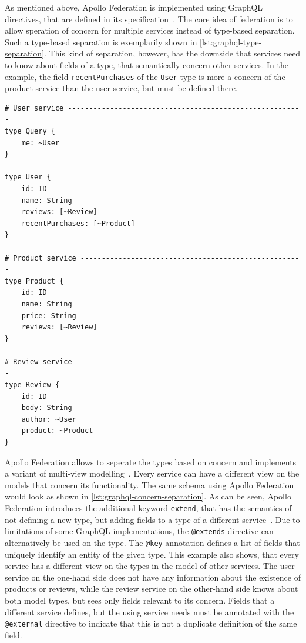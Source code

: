 As mentioned above, Apollo Federation is implemented using GraphQL directives, that are defined in its specification~\cite{MDGa}.
The core idea of federation is to allow speration of concern for multiple services instead of type-based separation.
Such a type-based separation is exemplarily shown in \autoref{lst:graphql-type-separation}.
This kind of separation, however, has the downside that services need to know about fields of a type, that semantically concern other services.
In the example, the field \texttt{recentPurchases} of the \texttt{User} type is more a concern of the product service than the user service, but must be defined there.

\begin{lstlisting}[language=graphqls, caption={Type-based separation in GraphQL Schemas~\cite{MDG}}, label={lst:graphql-type-separation}]
# User service --------------------------------------------------------
type Query {
    me: ~User
}

type User {
    id: ID
    name: String
    reviews: [~Review]
    recentPurchases: [~Product]
}

# Product service -----------------------------------------------------
type Product {
    id: ID
    name: String
    price: String
    reviews: [~Review]
}

# Review service ------------------------------------------------------
type Review {
    id: ID
    body: String
    author: ~User
    product: ~Product
}
\end{lstlisting}

Apollo Federation allows to seperate the types based on concern and implements a variant of multi-view modelling~\cite{MDG, Stuenkel2020}.
Every service can have a different view on the models that concern its functionality.
The same schema using Apollo Federation would look as shown in \autoref{lst:graphql-concern-separation}.
As can be seen, Apollo Federation introduces the additional keyword \texttt{extend}, that has the semantics of not defining a new type, but adding fields to a type of a different service~\cite{MDG}.
Due to limitations of some GraphQL implementations, the \texttt{@extends} directive can alternatively be used on the type.
The \texttt{@key} annotation defines a list of fields that uniquely identify an entity of the given type.
This example also shows, that every service has a different view on the types in the model of other services.
The user service on the one-hand side does not have any information about the existence of products or reviews, while the review service on the other-hand side knows about both model types, but sees only fields relevant to its concern.
Fields that a different service defines, but the using service needs must be annotated with the \texttt{@external} directive to indicate that this is not a duplicate definition of the same field.


